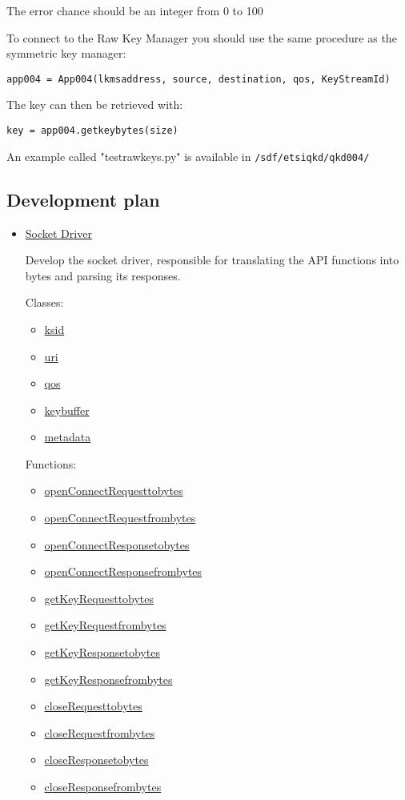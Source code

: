 \begin{refsection}
The error chance should be an integer from 0 to 100

To connect to the Raw Key Manager you should use the same procedure as the symmetric key manager:

\texttt{app004 = App004(lkms\textunderscore address, source, destination, qos, KeyStreamId)}

The key can then be retrieved with:

\texttt{key = app004.get\textunderscore key\textunderscore bytes(size)}

An example called "test\textunderscore raw\textunderscore keys.py" is available in \texttt{/sdf/etsi\textunderscore qkd/qkd004/} 

\subsection{Development plan}

\begin{itemize}
	
	\item\underline{Socket Driver}

		Develop the socket driver, responsible for translating the API functions into bytes and parsing its responses.
		
		Classes:
		\begin{itemize}
			\item\underline{ksid}
			\item\underline{uri}
			\item\underline{qos}
			\item\underline{key\textunderscore buffer}
			\item\underline{metadata}
		\end{itemize}				
		
		Functions:
		\begin{itemize}
			\item\underline{openConnectRequest\textunderscore tobytes}
			\item\underline{openConnectRequest\textunderscore frombytes}
			\item\underline{openConnectResponse\textunderscore tobytes}
			\item\underline{openConnectResponse\textunderscore frombytes}
			\item\underline{getKeyRequest\textunderscore tobytes}
			\item\underline{getKeyRequest\textunderscore frombytes}
			\item\underline{getKeyResponse\textunderscore tobytes}
			\item\underline{getKeyResponse\textunderscore frombytes}
			\item\underline{closeRequest\textunderscore tobytes}
			\item\underline{closeRequest\textunderscore frombytes}
			\item\underline{closeResponse\textunderscore tobytes}
			\item\underline{closeResponse\textunderscore frombytes}
		\end{itemize}
	

\end{itemize}
\end{refsection}
